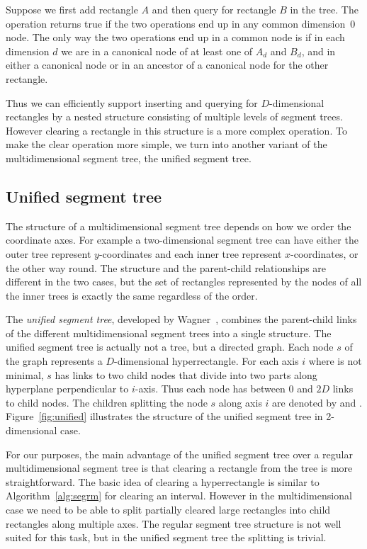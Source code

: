 \documentclass[english,gradu]{tktltiki2018}
\begin{document}
Suppose we first add rectangle $A$ and then query for rectangle $B$ in the tree.
The \checkdt operation returns true if the two operations end up in any common dimension~0 node.
The only way the two operations end up in a common node is if in each dimension $d$ we are in a canonical node of at least one of $A_d$ and $B_d$, and in either a canonical node or in an ancestor of a canonical node for the other rectangle.

Thus we can efficiently support inserting and querying for $D$-dimensional rectangles by a nested structure consisting of multiple levels of segment trees.
However clearing a rectangle in this structure is a more complex operation.
To make the clear operation more simple, we turn into another variant of the multidimensional segment tree, the unified segment tree.

\subsection{Unified segment tree}\label{sec:unifiedtree}

The structure of a multidimensional segment tree depends on how we order the coordinate axes.
For example a two-dimensional segment tree can have either the outer tree represent $y$-coordinates and each inner tree represent $x$-coordinates, or the other way round.
The structure and the parent-child relationships are different in the two cases, but the set of rectangles represented by the nodes of all the inner trees is exactly the same regardless of the order.

The \emph{unified segment tree}, developed by Wagner~\cite{unified}, combines the parent-child links of the different multidimensional segment trees into a single structure.
The unified segment tree is actually not a tree, but a directed graph.
Each node $s$ of the graph represents a $D$-dimensional hyperrectangle.
For each axis $i$ where  is not minimal, $s$ has links to two child nodes that divide  into two parts along hyperplane perpendicular to $i$-axis.
Thus each node has between 0 and $2D$ links to child nodes.
The children splitting the node $s$ along axis $i$ are denoted by  and .
Figure~\ref{fig:unified} illustrates the structure of the unified segment tree in 2-dimensional case.

For our purposes, the main advantage of the unified segment tree over a regular multidimensional segment tree is that clearing a rectangle from the tree is more straightforward.
The basic idea of clearing a hyperrectangle is similar to Algorithm~\ref{alg:segrm} for clearing an interval.
However in the multidimensional case we need to be able to split partially cleared large rectangles into child rectangles along multiple axes.
The regular segment tree structure is not well suited for this task, but in the unified segment tree the splitting is trivial.
\end{document}

